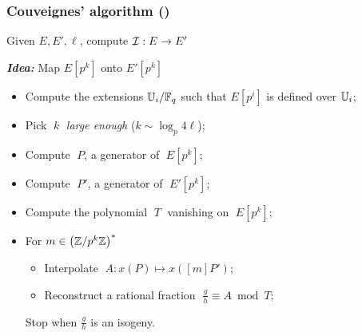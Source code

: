 \documentclass[10pt,usepdftitle=false]{beamer}
\begin{document}
\begin{frame}
  \frametitle{Couveignes' algorithm (\cite{couveignes96})}
  
  \begin{center}
    \large
    Given $E, E', \ell$, compute $\mathcal{I}:E\to E'$
  \end{center}

  \begin{center}
    \emph{\textbf{Idea:}} Map $E[p^k]$ onto $E'[p^k]$
  \end{center}
  
  \begin{itemize}
  \item Compute the extensions $\mathbb{U}_i/\mathbb{F}_q$ such that $E[p^i]$ is
    defined over $\mathbb{U}_i$;
  \item Pick $\;k\;$ \emph{large enough} ($k\sim\log_p4\ell$);
  \item Compute $\;P$, a generator of $\;E[p^k]$;
  \item Compute $\;P'$, a generator of $\;E'[p^k]$;
  \item Compute the polynomial $\;T\;$ vanishing on $\;E[p^k]$;
  \item For $m\in\left(\mathbb{Z}/p^k\mathbb{Z}\right)^\ast$
    \begin{itemize}
      \normalsize
    \item Interpolate $\;A : x(P) \mapsto x([m]P')$;
    \item Reconstruct a rational fraction  $\;\frac{g}{h}\equiv A \bmod T$;
    \end{itemize}
    \alert<3>{Stop when $\frac{g}{h}$ is an isogeny.}
  \end{itemize}
\end{frame}

\end{document}
